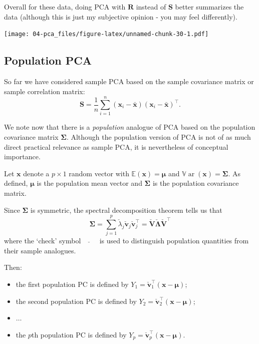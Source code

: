 \documentclass[
]{book}
\providecommand{\tightlist}{%
  \setlength{\itemsep}{0pt}\setlength{\parskip}{0pt}}
\theoremstyle{definition}
\theoremstyle{definition}
\theoremstyle{definition}
\theoremstyle{definition}
\theoremstyle{remark}
\begin{document}
Overall for these data, doing PCA with \(\mathbf R\) instead of \(\mathbf S\) better summarizes the data (although this is just my subjective opinion - you may feel differently).

\texttt{[image: 04-pca\_files/figure-latex/unnamed-chunk-30-1.pdf]}

\hypertarget{population-pca}{%
\subsection{Population PCA}\label{population-pca}}

So far we have considered sample PCA based on the sample covariance matrix or sample correlation matrix:
\[
\mathbf S=\frac{1}{n}\sum_{i=1}^n (\mathbf x_i-\bar{\mathbf x})(\mathbf x_i-\bar{\mathbf x})^\top.
\]

We note now that there is a \emph{population} analogue of PCA based on the population
covariance matrix \(\boldsymbol{\Sigma}\). Although the population version of PCA is not of as much direct practical
relevance as sample PCA, it is nevertheless of conceptual importance.

Let \(\mathbf x\) denote a \(p \times 1\) random vector with \({\mathbb{E}}(\mathbf x)={\pmb \mu}\) and \({\mathbb{V}\operatorname{ar}}(\mathbf x)={\pmb \Sigma}\). As defined,
\(\pmb \mu\) is the population mean vector and \(\pmb \Sigma\) is the population covariance matrix.

Since \(\pmb \Sigma\) is symmetric, the spectral decomposition theorem tells us that
\[
{\pmb \Sigma}=\sum_{j=1}^p \check{\lambda}_j \check{\mathbf v}_j \check{\mathbf v}_j^\top=\check{\mathbf V} \check{\boldsymbol \Lambda}\check{\mathbf V}^\top
\]
where the `check' symbol \(\quad \check{} \quad\) is used to distinguish population quantities from their sample analogues.

Then:

\begin{itemize}
\tightlist
\item
  the first population PC is defined by \(Y_1=\check{\mathbf v}_1^\top (\mathbf x-{\pmb \mu})\);
\item
  the second population PC is defined by \(Y_2=\check{\mathbf v}_2^\top (\mathbf x-{\pmb \mu})\);
\item
  \(\ldots\)
\item
  the \(p\)th population PC is defined by \(Y_p=\check{\mathbf v}_p^\top (\mathbf x-{\pmb \mu})\).
\end{itemize}
\end{document}
